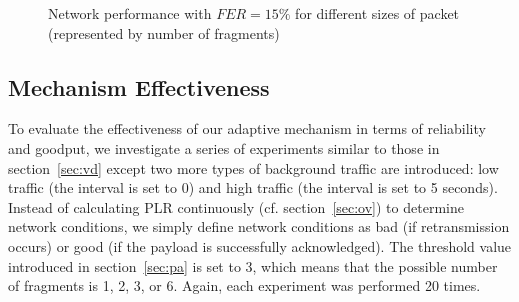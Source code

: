 \documentclass[runningheads,a4paper]{llncs}
\begin{document}
\begin{figure}
	\vspace{-15pt}
	\centering
	\caption{Network performance with $FER=15\%$  for different sizes of packet (represented by number of fragments)}
	\label{fig:vd}
	\vspace{-15pt}
\end{figure}

\subsection{Mechanism Effectiveness}
To evaluate the effectiveness of our adaptive mechanism in terms of reliability and goodput, we investigate a series of experiments similar to those in section~\ref{sec:vd} except two more types of background traffic are introduced: low traffic (the interval is set to 0) and high traffic (the interval is set to 5 seconds). Instead of calculating PLR continuously (cf. section~\ref{sec:ov}) to determine network conditions, we simply define network conditions as bad (if retransmission occurs) or good (if the payload is successfully acknowledged). The threshold value introduced in section~\ref{sec:pa} is set to 3, which means that the possible number of fragments is 1, 2, 3, or 6. Again, each experiment was performed 20 times.
\end{document}
